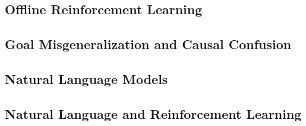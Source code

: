 \documentclass[../thesis-proposal/main.tex]{subfiles}
\begin{document}
\subsection{Offline Reinforcement Learning}
\subsection{Goal Misgeneralization and Causal Confusion}
\subsection{Natural Language Models}
\subsection{Natural Language and Reinforcement Learning}
\end{document}
